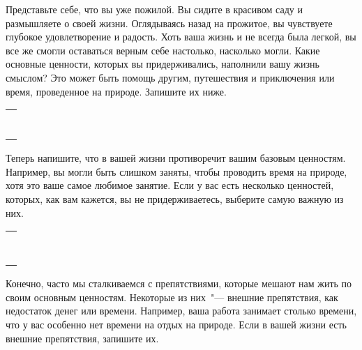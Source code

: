  \label{Ex:Discovering_Our_Core_Values}
\begin{itemize}
	\itemWritingHand Представьте себе, что вы уже пожилой. Вы сидите в красивом саду и размышляете о своей жизни. Оглядываясь назад на прожитое, вы чувствуете глубокое удовлетворение и радость. Хоть ваша жизнь и не всегда была легкой, вы все же смогли оставаться верным себе настолько, насколько могли. Какие основные ценности, которых вы придерживались, наполнили вашу жизнь смыслом? Это может быть помощь другим, путешествия и приключения или время, проведенное на природе. Запишите их ниже.
\end{itemize}

\setlength{\extrarowheight}{2mm}
\begin{tabularx}{\textwidth}{X}
	\\
	\arrayrulecolor{gray}\hline\\
	\hline\\
	\hline\\
	\hline\\
	\hline\\
	\hline\\	
	\hline\\
	\hline\\
\end{tabularx}
\setlength{\extrarowheight}{0mm}
\begin{itemize}
	\itemWritingHand Теперь напишите, что в вашей жизни противоречит вашим базовым ценностям. Например, вы могли быть слишком заняты, чтобы проводить время на природе, хотя это ваше самое любимое занятие.  Если у вас есть несколько ценностей, которых, как вам кажется, вы не придерживаетесь, выберите самую важную из них.
\end{itemize}

\setlength{\extrarowheight}{2mm}
\begin{tabularx}{\textwidth}{X}
	\\
	\arrayrulecolor{gray}\hline\\
	\hline\\
	\hline\\
	\hline\\
	\hline\\
	\hline\\	
	\hline\\
	\hline\\
	\hline\\
\end{tabularx}
\setlength{\extrarowheight}{0mm}
\begin{itemize}
	\itemWritingHand Конечно, часто мы сталкиваемся с препятствиями, которые мешают нам жить по своим основным ценностям. Некоторые из них~"--- внешние препятствия, как недостаток денег или времени. Например, ваша работа занимает столько времени, что у вас особенно нет времени на отдых на природе. Если в вашей жизни есть внешние препятствия, запишите их.
\end{itemize}

